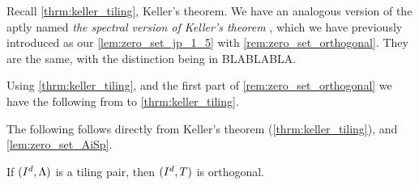 \documentclass[../thesis.tex]{subfiles}
\begin{document}
  








Recall \cref{thrm:keller_tiling}, Keller's theorem. We have an analogous version of the  aptly named \emph{the spectral version of Keller's theorem} \cite{iosevichSpectralTilingProperties1998}, which we have previously introduced as our \cref{lem:zero_set_jp_1_5} with \cref{rem:zero_set_orthogonal}. They are the same, with the distinction being in BLABLABLA. 


Using \cref{thrm:keller_tiling}, and the first part of \cref{rem:zero_set_orthogonal} we have the following  from to \cref{thrm:keller_tiling}. 


The following  follows directly from Keller's theorem (\cref{thrm:keller_tiling}), and \cref{lem:zero_set_AiSp}.

\begin{corollary}\label{cor:tiling_pair_implies_orthogonal}
    If $(I^d, \Lambda)$ is a tiling pair, then $(I^d,T)$ is orthogonal. %
\end{corollary}
\end{document}
